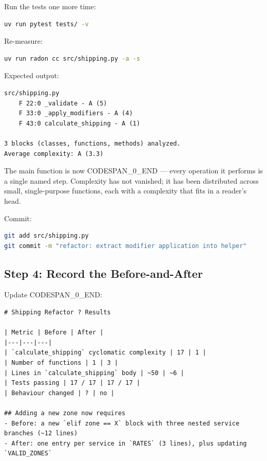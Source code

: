 \documentclass[11pt,a4paper]{book}
\begin{document}
Run the tests one more time:

\begin{lstlisting}[language=Bash]
uv run pytest tests/ -v
\end{lstlisting}

Re-measure:

\begin{lstlisting}[language=Bash]
uv run radon cc src/shipping.py -a -s
\end{lstlisting}

Expected output:

\begin{lstlisting}
src/shipping.py
    F 22:0 _validate - A (5)
    F 33:0 _apply_modifiers - A (4)
    F 43:0 calculate_shipping - A (1)

3 blocks (classes, functions, methods) analyzed.
Average complexity: A (3.3)
\end{lstlisting}

The main function is now CODESPAN\_0\_END --- every operation it performs is a single named step. Complexity has not vanished; it has been distributed across small, single-purpose functions, each with a complexity that fits in a reader's head.

Commit:

\begin{lstlisting}[language=Bash]
git add src/shipping.py
git commit -m "refactor: extract modifier application into helper"
\end{lstlisting}

\medskip

\subsection{Step 4: Record the Before-and-After}

Update CODESPAN\_0\_END:

\begin{lstlisting}
# Shipping Refactor ? Results

| Metric | Before | After |
|---|---|---|
| `calculate_shipping` cyclomatic complexity | 17 | 1 |
| Number of functions | 1 | 3 |
| Lines in `calculate_shipping` body | ~50 | ~6 |
| Tests passing | 17 / 17 | 17 / 17 |
| Behaviour changed | ? | no |

## Adding a new zone now requires
- Before: a new `elif zone == X` block with three nested service branches (~12 lines)
- After: one entry per service in `RATES` (3 lines), plus updating `VALID_ZONES`
\end{lstlisting}
\end{document}
